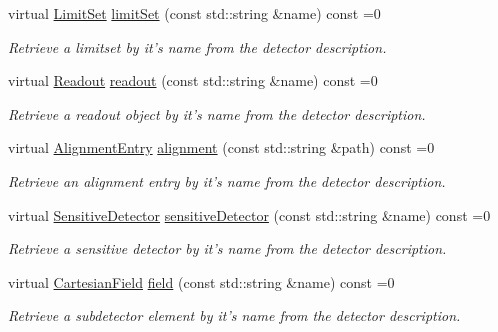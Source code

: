 \begin{DoxyCompactItemize}
virtual \hyperlink{class_d_d4hep_1_1_geometry_1_1_limit_set}{LimitSet} \hyperlink{class_d_d4hep_1_1_geometry_1_1_l_c_d_d_a7e98996675e9c00d6b64010415511813}{limitSet} (const std::string \&name) const =0
\begin{DoxyCompactList}\small\item\em Retrieve a limitset by it's name from the detector description. \item\end{DoxyCompactList}\item 
virtual \hyperlink{class_d_d4hep_1_1_geometry_1_1_readout}{Readout} \hyperlink{class_d_d4hep_1_1_geometry_1_1_l_c_d_d_aa29f75fba9942edd7f73226a11c9598e}{readout} (const std::string \&name) const =0
\begin{DoxyCompactList}\small\item\em Retrieve a readout object by it's name from the detector description. \item\end{DoxyCompactList}\item 
virtual \hyperlink{class_d_d4hep_1_1_geometry_1_1_alignment_entry}{AlignmentEntry} \hyperlink{class_d_d4hep_1_1_geometry_1_1_l_c_d_d_a5661c5a5c9519f58e3044fa66e5393fa}{alignment} (const std::string \&path) const =0
\begin{DoxyCompactList}\small\item\em Retrieve an alignment entry by it's name from the detector description. \item\end{DoxyCompactList}\item 
virtual \hyperlink{class_d_d4hep_1_1_geometry_1_1_sensitive_detector}{SensitiveDetector} \hyperlink{class_d_d4hep_1_1_geometry_1_1_l_c_d_d_af476b8241b93e82350ec1e5cbf145941}{sensitiveDetector} (const std::string \&name) const =0
\begin{DoxyCompactList}\small\item\em Retrieve a sensitive detector by it's name from the detector description. \item\end{DoxyCompactList}\item 
virtual \hyperlink{class_d_d4hep_1_1_geometry_1_1_cartesian_field}{CartesianField} \hyperlink{class_d_d4hep_1_1_geometry_1_1_l_c_d_d_adcc7929860f5ac592d8f4c2d476555e9}{field} (const std::string \&name) const =0
\begin{DoxyCompactList}\small\item\em Retrieve a subdetector element by it's name from the detector description. \item\end{DoxyCompactList}\item 

\end{DoxyCompactItemize}

